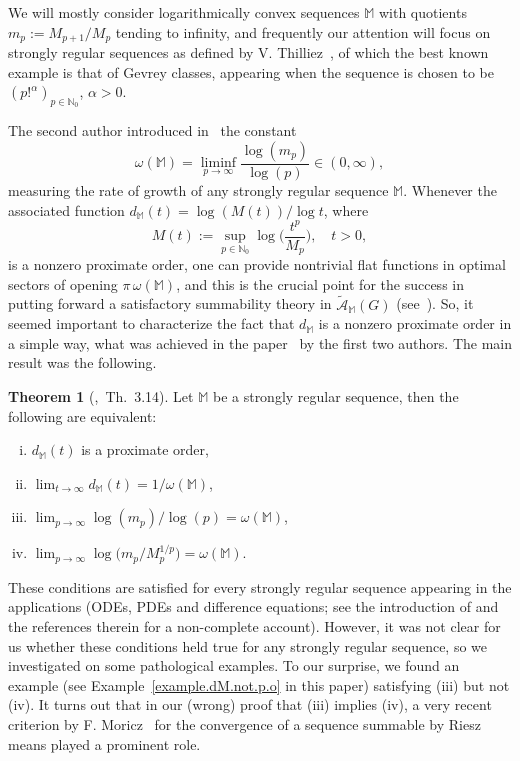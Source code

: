 \documentclass[11pt,a4paper]{article}
\theoremstyle{definition}
\newtheorem{theo}{Theorem}[section]
\def\oo{\infty}
\def\ri{\rightarrow}
\def\a{\alpha}
\def\o{\omega}
\def\N{\mathbb{N}}
\def\M{\mathbb{M}}
\begin{document}
We will mostly consider logarithmically convex sequences $\M$ with quotients $m_p:=M_{p+1}/M_p$ tending to infinity, and frequently our attention will focus on
strongly regular sequences as defined by V. Thilliez~\cite{thilliez},
of which the best known example is that of Gevrey classes, appearing when the sequence is chosen to be $(p!^{\a})_{p\in\N_{0}}$, $\a>0$.

The second author introduced in~\cite{SanzFlat} the constant \begin{equation*}
\omega(\M)=\liminf_{p\to\infty}
\frac{\log(m_{p})}{\log(p)}\in(0,\infty),
\end{equation*}
measuring the rate of growth of any strongly regular sequence $\M$. Whenever the associated function $d_{\M}(t)=\log(M(t))/\log t$, where
\begin{equation}\label{eqDefinMdet}
M(t):=\sup_{p\in\N_{0}}\log\big(\frac{t^p}{M_{p}}\big)
,\quad t>0,
\end{equation}
is a nonzero proximate order, one can provide nontrivial flat functions in optimal sectors of opening $\pi\,\omega(\M)$, and this is the crucial point for the success in putting forward a satisfactory summability theory in $\tilde{\mathcal{A}}_{\M}(G)$ (see~\cite{lastramaleksanz3}). So, it seemed important to characterize the fact that $d_{\M}$ is a nonzero proximate order in a simple way, what was achieved in the paper~\cite{JimenezSanz} by the first two authors. The main result was the following.

\begin{theo}[\cite{JimenezSanz},\ Th.\ 3.14]\label{theorem.condition3.implies.beta.converge}
    Let $\M$ be a strongly regular sequence, then the following are equivalent:
\begin{enumerate}[(i)]
 \item $d_{\M}(t)$ is a proximate order,
 \item $\lim_{t\ri\oo}d_{\M}(t)=1/\o(\M)$,
 \item $\lim_{p\ri\oo} \log(m_p)/\log(p)=\o(\M)$,
 \item  $\lim_{p\ri\oo} \log\big(m_p/M_p^{1/p}\big)=\o(\M)$.
\end{enumerate}
\end{theo}

These conditions are satisfied for every strongly regular sequence appearing in the applications (ODEs, PDEs and difference equations; see the introduction of \cite{JimenezSanz} and the references therein for a non-complete account). However, it was not clear for us whether these conditions held true for any strongly regular sequence, so we investigated on some pathological examples. To our surprise, we found an example (see Example~\ref{example.dM.not.p.o} in this paper) satisfying (iii) but not (iv). It turns out that in our (wrong) proof that (iii) implies (iv), a very recent criterion by F. Moricz~\cite{Moricz} for the convergence of a sequence summable by Riesz means played a prominent role.
\end{document}
